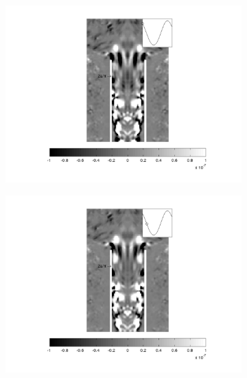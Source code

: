 \begin{landscape}
\newpage
\vfill
\begin{figure}[ht!]
\begin{subfigure}{0.55 \textwidth}
  \includegraphics[width=1.\linewidth]{figuras/max_ka_01_1.png}
  \caption[]{}
  \label{fig:max_01_1}
\end{subfigure}
\begin{subfigure}{0.55 \textwidth}
  \includegraphics[width=1.\linewidth]{figuras/max_ka_01_2.png}
  \caption[]{}
  \label{fig:max_01_2}
\end{subfigure}
\begin{subfigure}{0.55 \textwidth}

\end{subfigure}
\end{figure}
\end{landscape}
